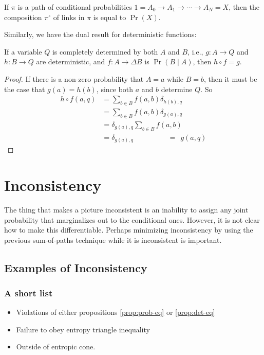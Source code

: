 \documentclass{article}
\begin{document}
	\begin{prop}\label{prop:prob-eq}
		If $\pi$ is a path of conditional probabilities $1 = A_0 \to A_1\to\cdots \to A_N = X$, then the composition $\pi^\circ$ of links in $\pi$ is equal to $\Pr(X)$.
	\end{prop}

	Similarly, we have the dual result for deterministic functions:
	\begin{prop}\label{prop:det-eq}
		If a variable $Q$ is completely determined by both $A$ and $B$, i.e., $g : A\to Q$ and $h : B\to Q$ are deterministic, and $f : A \to \Delta B$ is $\Pr(B \mid A)$, then $h \circ f = g$. 
	\end{prop}
	\begin{proof}
		If there is a non-zero probability that $A = a$ while $B = b$, then it must be the case that $g(a) = h(b)$, since both $a$ and $b$ determine $Q$. So
		\begin{align*}
			h \circ f(a,q) &= \sum_{b \in B} f(a,b) \delta_{h(b),q}\\	
					&= \sum_{b \in B} f(a,b) \delta_{g(a), q} \\
					&= \delta_{g(a),q} \sum_{b \in B} f(a,b) \\
					&= \delta_{g(a),q} 
					\hspace{2cm}=~~g(a, q)
		\end{align*}
	\end{proof}
	
	\section{Inconsistency}
	The thing that makes a picture inconsistent is an inability to assign any joint probability that marginalizes out to the conditional ones. However, it is not clear how to make this differentiable. Perhaps minimizing inconsistency by using the previous sum-of-paths technique while it is inconsistent is important.
	
	\subsection{Examples of Inconsistency}\label{sec:inconsistency-ex}
	\subsubsection{A short list}
	\begin{itemize}[nosep]
		\item Violations of either propositions \ref{prop:prob-eq} or \ref{prop:det-eq}
		\item Failure to obey entropy triangle inequality
		\item Outside of entropic cone.
	\end{itemize}
	
\end{document}
